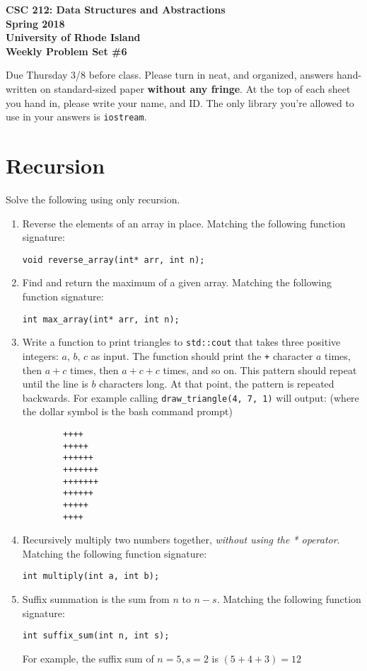 \documentclass[11pt]{article}
\begin{document}
\thispagestyle{empty}

\begin{center}
    {\Large\bf CSC 212: Data Structures and Abstractions}\\
    \medskip
    {\Large\bf Spring 2018}\\
    \medskip
    {\Large\bf University of Rhode Island}\\
    \bigskip
    {\Large\bf Weekly Problem Set \#6}
\end{center}

Due Thursday 3/8 before class. Please turn in neat, and organized, answers hand-written on standard-sized paper \textbf{without any fringe}. At the top of each sheet you hand in, please write your name, and ID.
The only library you're allowed to use in your answers is \verb|iostream|.

\section{Recursion}
Solve the following using only recursion.
\begin{enumerate}
    \item Reverse the elements of an array in place. Matching the following function signature: 
    
        \verb|void reverse_array(int* arr, int n);|

    \item Find and return the maximum of a given array. Matching the following function signature: 
    
        \verb|int max_array(int* arr, int n);|

    \item Write a function to print triangles to \verb|std::cout| that takes three positive integers: $a$, $b$, $c$ as input. The function should print the \verb|+| character $a$ times, then $a+c$ times, then $a+c+c$ times, and so on. This pattern should repeat until the line is $b$ characters long. At that point, the pattern is repeated backwards. For example calling \verb|draw_triangle(4, 7, 1)| will output: (where the dollar symbol is the bash command prompt)
    \begin{verbatim}
        ++++
        +++++
        ++++++
        +++++++
        +++++++
        ++++++
        +++++
        ++++
    \end{verbatim} 

    \item Recursively multiply two numbers together, \emph{without using the * operator}. Matching the following function signature:

        \verb|int multiply(int a, int b);|

    \item Suffix summation is the sum from $n$ to $n-s$. Matching the following function signature:

        \verb|int suffix_sum(int n, int s);| 

    For example, the suffix sum of $n=5, s=2$ is $(5+4+3) = 12$
\end{enumerate}

\label{r:lastpage}
\end{document}
